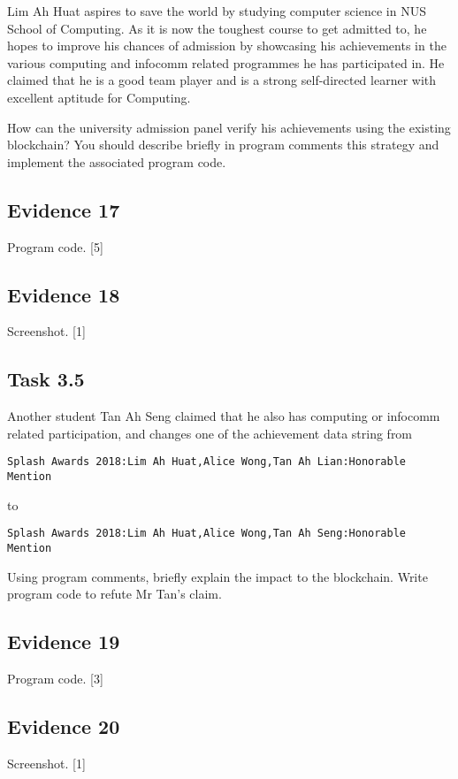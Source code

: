 Lim Ah Huat aspires to save the world by studying computer science
in NUS School of Computing. As it is now the toughest course to get
admitted to, he hopes to improve his chances of admission by showcasing
his achievements in the various computing and infocomm related programmes
he has participated in. He claimed that he is a good team player and
is a strong self-directed learner with excellent aptitude for Computing.

How can the university admission panel verify his achievements using
the existing blockchain? You should describe briefly in program comments
this strategy and implement the associated program code.

\subsection*{Evidence 17 }

Program code. \hfill{}{[}5{]}

\subsection*{Evidence 18}

Screenshot.\hfill{} {[}1{]}

\subsection*{Task 3.5 }

Another student Tan Ah Seng claimed that he also has computing or
infocomm related participation, and changes one of the achievement
data string from 

\texttt{Splash Awards 2018:Lim Ah Huat,Alice Wong,Tan Ah Lian:Honorable
Mention}

to

\texttt{Splash Awards 2018:Lim Ah Huat,Alice Wong,Tan Ah Seng:Honorable
Mention}

Using program comments, briefly explain the impact to the blockchain.
Write program code to refute Mr Tan's claim.

\subsection*{Evidence 19 }

Program code. \hfill{}{[}3{]}

\subsection*{Evidence 20 }

Screenshot.\hfill{} {[}1{]}
